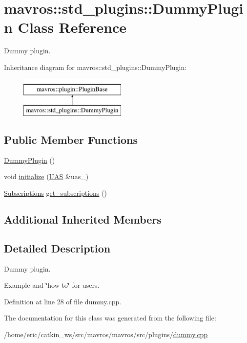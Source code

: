 \hypertarget{classmavros_1_1std__plugins_1_1DummyPlugin}{}\section{mavros\+::std\+\_\+plugins\+::Dummy\+Plugin Class Reference}
\label{classmavros_1_1std__plugins_1_1DummyPlugin}


Dummy plugin.  


Inheritance diagram for mavros\+::std\+\_\+plugins\+::Dummy\+Plugin\+:\begin{figure}[H]
\begin{center}
\leavevmode
\includegraphics[height=2.000000cm]{classmavros_1_1std__plugins_1_1DummyPlugin}
\end{center}
\end{figure}
\subsection*{Public Member Functions}
\begin{DoxyCompactItemize}
\item 
\mbox{\hyperlink{group__plugin_ga86a0b9e56760d9d51fc5bfc8f3e358af}{Dummy\+Plugin}} ()
\item 
void \mbox{\hyperlink{group__plugin_gaea785dd0427ba4c5f2c0de94da43285f}{initialize}} (\mbox{\hyperlink{classmavros_1_1UAS}{U\+AS}} \&uas\+\_\+)
\item 
\mbox{\hyperlink{group__plugin_ga8967d61fc77040e0c3ea5a4585d62a09}{Subscriptions}} \mbox{\hyperlink{group__plugin_gaf24dcc35ae67b2e6842effce1e9c3803}{get\+\_\+subscriptions}} ()
\end{DoxyCompactItemize}
\subsection*{Additional Inherited Members}


\subsection{Detailed Description}
Dummy plugin. 

Example and \char`\"{}how to\char`\"{} for users. 

Definition at line 28 of file dummy.\+cpp.



The documentation for this class was generated from the following file\+:\begin{DoxyCompactItemize}
\item 
/home/eric/catkin\+\_\+ws/src/mavros/mavros/src/plugins/\mbox{\hyperlink{mavros_2mavros_2src_2plugins_2dummy_8cpp}{dummy.\+cpp}}\end{DoxyCompactItemize}
